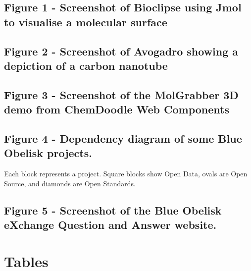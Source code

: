 \documentclass[10pt]{bmc_article}
\newenvironment{bmcformat}{\fussy\setboolean{publ}{true}}{\fussy}
\begin{document}
\begin{bmcformat}
 \subsection*{Figure 1 - Screenshot of Bioclipse using Jmol to
visualise a molecular surface}

 \subsection*{Figure 2 - Screenshot of Avogadro showing a depiction of
a carbon nanotube}

 \subsection*{Figure 3 - Screenshot of the MolGrabber 3D demo from
ChemDoodle Web Components}

  \subsection*{Figure 4 - Dependency diagram of some Blue Obelisk projects.}
Each block represents a project. Square blocks show Open Data, ovals are Open Source,
and diamonds are Open Standards.

  \subsection*{Figure 5 - Screenshot of the Blue Obelisk eXchange Question
    and Answer website.}



\section*{Tables}

\end{bmcformat}
\end{document}
